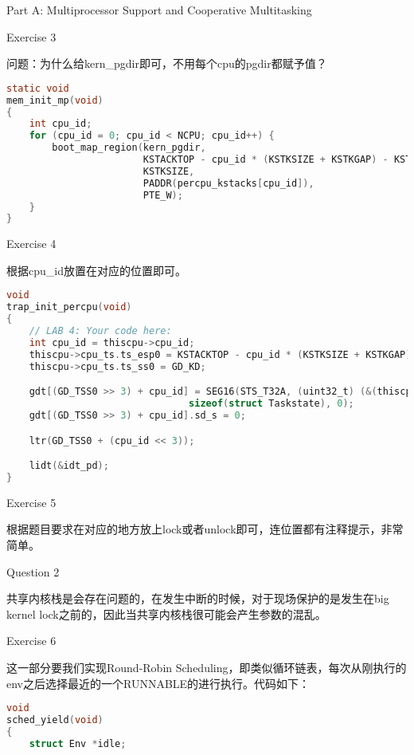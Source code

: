 \documentclass[GBK,winfonts,a4paper,10pt]{ctexart}
\begin{document}
\begin{section}{Part A: Multiprocessor Support and Cooperative Multitasking}
\begin{subsection}{Exercise 3}
\par
问题：为什么给kern\_pgdir即可，不用每个cpu的pgdir都赋予值？
\begin{lstlisting}[language=C]
static void
mem_init_mp(void)
{    
    int cpu_id;
    for (cpu_id = 0; cpu_id < NCPU; cpu_id++) {
        boot_map_region(kern_pgdir,
                        KSTACKTOP - cpu_id * (KSTKSIZE + KSTKGAP) - KSTKSIZE,
                        KSTKSIZE,
                        PADDR(percpu_kstacks[cpu_id]),
                        PTE_W);
    }
}
\end{lstlisting}
\end{subsection}

\begin{subsection}{Exercise 4}
\par
根据cpu\_id放置在对应的位置即可。
\begin{lstlisting}[language=C]
void
trap_init_percpu(void)
{
	// LAB 4: Your code here:
    int cpu_id = thiscpu->cpu_id;
    thiscpu->cpu_ts.ts_esp0 = KSTACKTOP - cpu_id * (KSTKSIZE + KSTKGAP);
    thiscpu->cpu_ts.ts_ss0 = GD_KD;

    gdt[(GD_TSS0 >> 3) + cpu_id] = SEG16(STS_T32A, (uint32_t) (&(thiscpu->cpu_ts)),
    							sizeof(struct Taskstate), 0);
    gdt[(GD_TSS0 >> 3) + cpu_id].sd_s = 0;

    ltr(GD_TSS0 + (cpu_id << 3));

    lidt(&idt_pd);
}
\end{lstlisting}
\end{subsection}

\begin{subsection}{Exercise 5}
\par
根据题目要求在对应的地方放上lock或者unlock即可，连位置都有注释提示，非常简单。
\end{subsection}

\begin{subsection}{Question 2}
\par
共享内核栈是会存在问题的，在发生中断的时候，对于现场保护的是发生在big kernel lock之前的，因此当共享内核栈很可能会产生参数的混乱。
\end{subsection}

\begin{subsection}{Exercise 6}
\par
这一部分要我们实现Round-Robin Scheduling，即类似循环链表，每次从刚执行的env之后选择最近的一个RUNNABLE的进行执行。代码如下：
\begin{lstlisting}[language=C]
void
sched_yield(void)
{
	struct Env *idle;


\end{lstlisting}
\end{subsection}
\end{section}
\end{document}
